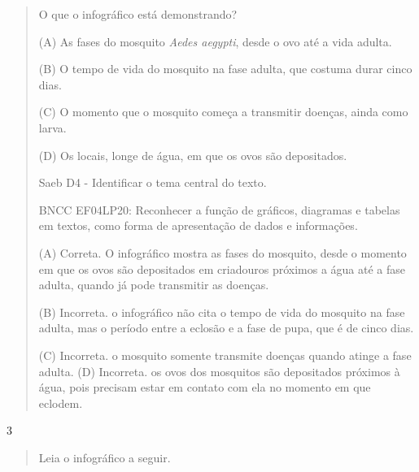 \begin{escolha}
\begin{escolha}
{\begin{quote}
\protect\hypertarget{_Hlk128465624}{}{}O que o infográfico está
demonstrando?

(A) As fases do mosquito \emph{Aedes aegypti}, desde o ovo até a vida
adulta.

(B) O tempo de vida do mosquito na fase adulta, que costuma durar cinco
dias.

(C) O momento que o mosquito começa a transmitir doenças, ainda como
larva.

(D) Os locais, longe de água, em que os ovos são depositados.

Saeb D4 - Identificar o tema central do texto.

BNCC EF04LP20: Reconhecer a função de gráficos, diagramas e tabelas em
textos, como forma de apresentação de dados e informações.

(A) Correta. O infográfico mostra as fases do mosquito, desde o momento
em que os ovos são depositados em criadouros próximos a água até a fase
adulta, quando já pode transmitir as doenças.

(B) Incorreta. o infográfico não cita o tempo de vida do mosquito na
fase adulta, mas o período entre a eclosão e a fase de pupa, que é de
cinco dias.

(C) Incorreta. o mosquito somente transmite doenças quando atinge a fase
adulta. (D) Incorreta. os ovos dos mosquitos são depositados próximos à
água, pois precisam estar em contato com ela no momento em que eclodem.
\end{quote}

\num{3}

\begin{quote}
Leia o infográfico a seguir.


\end{quote}}
\end{escolha}
\end{escolha}
